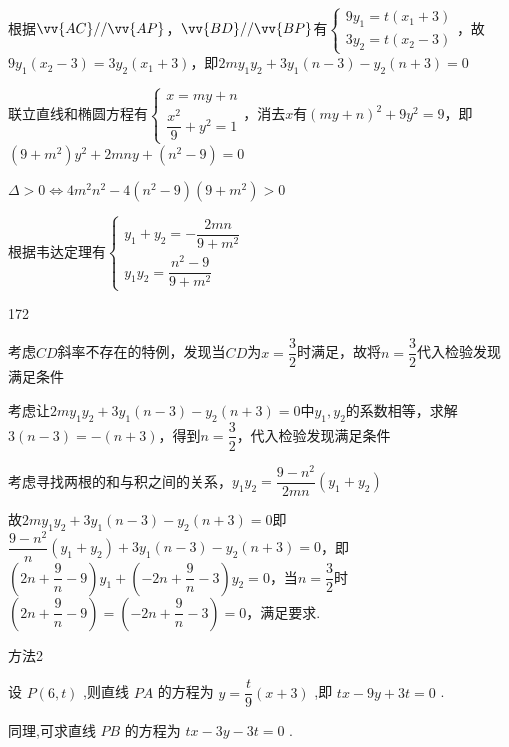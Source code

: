 \begin{enumerate}
\begin{jieda}
\begin{enumerate}
                根据$\vv{AC} // \vv{AP}$，$\vv{BD} // \vv{BP}$有$\left\{\begin{array}{l}
                     9y_1 = t(x_1+3)  \\
                     3y_2 = t(x_2-3) 
                \end{array}\right.$，故$9y_1(x_2-3) = 3y_2(x_1+3)$，即$2my_1y_2+3y_1(n-3)-y_2(n+3) = 0$
    
                联立直线和椭圆方程有$\left\{\begin{array}{l}
                     x = my+n \\
                     \dfrac{{x}^{2}}{9} + {y}^{2} = 1
                \end{array}\right.$，消去$x$有$(my+n)^2+9y^2 = 9$，即$(9+m^2)y^2+2mny+(n^2-9) = 0$
    
                $\Delta > 0 \Longleftrightarrow 4m^2n^2 - 4(n^2-9)(9+m^2) > 0$
    
                根据韦达定理有$\left\{\begin{array}{l}
                     y_1+y_2 = -\dfrac{2mn}{9+m^2} \\
                     y_1y_2 = \dfrac{n^2-9}{9+m^2}
                \end{array}\right.$
                \begin{dingautolist}{172}
                    \item 考虑$CD$斜率不存在的特例，发现当$CD$为$x = \dfrac{3}{2}$时满足，故将$n = \dfrac{3}{2}$代入检验发现满足条件
                    \item 考虑让$2my_1y_2+3y_1(n-3)-y_2(n+3) = 0$中$y_1, y_2$的系数相等，求解$3(n-3) = -(n+3)$，得到$n = \dfrac{3}{2}$，代入检验发现满足条件
                    \item 考虑寻找两根的和与积之间的关系，$y_1y_2 = \dfrac{9-n^2}{2mn}(y_1+y_2)$
    
                    故$2my_1y_2+3y_1(n-3)-y_2(n+3) = 0$即$\dfrac{9-n^2}{n}(y_1+y_2)+3y_1(n-3)-y_2(n+3) = 0$，即$\left(2n+\dfrac{9}{n}-9\right)y_1 + \left(-2n+\dfrac{9}{n}-3\right)y_2 = 0$，当$n = \dfrac{3}{2}$时$\left(2n+\dfrac{9}{n}-9\right) = \left(-2n+\dfrac{9}{n}-3\right) = 0$，满足要求.
                \end{dingautolist}
            方法2
    
                设 $P\left( {6,t}\right)$ ,则直线 ${PA}$ 的方程为 $y = \dfrac{t}{9}\left( {x + 3}\right)$ ,即 ${tx} - {9y} + {3t} = 0$ .
                
                同理,可求直线 ${PB}$ 的方程为 ${tx} - {3y} - {3t} = 0$ .
                

\end{enumerate}
\end{jieda}
\end{enumerate}
